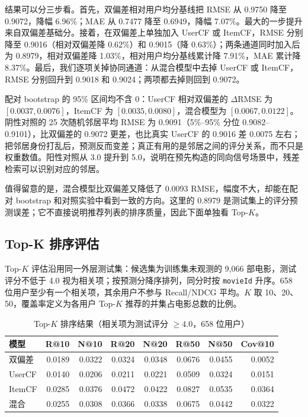 \documentclass[10pt,a4paper]{article}
\newcommand{\term}[1]{\textbf{\color{navy}#1}}
\newcommand{\code}[1]{\texttt{#1}}
\begin{document}
结果可以分三步看。首先，双偏差相对用户均分基线把 RMSE 从 0.9750 降至 0.9072，降幅 6.96\%；MAE 从 0.7477 降至 0.6949，降幅 7.07\%。最大的一步提升来自双偏差基础分。接着，在双偏差上单独加入 UserCF 或 ItemCF，RMSE 分别降至 0.9016（相对双偏差降 0.62\%）和 0.9015（降 0.63\%）；两条通道同时加入后为 0.8979，相对双偏差降 1.03\%，相对用户均分基线累计降 7.91\%，MAE 累计降 8.37\%。最后，我们逐项关掉协同通道：从混合模型中去掉 UserCF 或 ItemCF，RMSE 分别回升到 0.9018 和 0.9024；两项都去掉则回到 0.9072。

配对 bootstrap 的 95\% 区间均不含 0：UserCF 相对双偏差的 $\Delta$RMSE 为 $[0.0037,0.0076]$，ItemCF 为 $[0.0035,0.0080]$，混合模型为 $[0.0067,0.0122]$。阴性对照的 25 次随机邻居平均 RMSE 为 0.9091（5\%--95\% 分位 0.9082--0.9101），比双偏差的 0.9072 更差，也比真实 UserCF 的 0.9016 差 0.0075 左右；把邻居身份打乱后，预测反而变差；真正有用的是邻居之间的评分关系，而不只是权重数值。阳性对照从 3.0 提升到 5.0，说明在预先构造的同向信号场景中，残差检索可以识别对应的邻居。

值得留意的是，混合模型比双偏差又降低了 0.0093 RMSE，幅度不大，却能在配对 bootstrap 和对照实验中看到一致的方向。这里的 0.8979 是测试集上的评分预测误差；它不直接说明推荐列表的排序质量，因此下面单独看 Top-$K$。

\subsection{Top-K 排序评估}
Top-$K$ 评估沿用同一外层测试集：候选集为训练集未观测的 9,066 部电影，测试评分不低于 4.0 视为相关项；按预测分降序排列，同分时按 \code{movieId} 升序。658 位用户至少有一个相关项，其余用户不参与 Recall/NDCG 平均。$K$ 取 10、20、50，覆盖率定义为各用户 Top-$K$ 推荐的并集占电影总数的比例。

\begin{table}[htbp]
\centering
\small
\caption{Top-$K$ 排序结果（相关项为测试评分 $\ge 4.0$，658 位用户）}\label{tab:ranking}
\begin{tabular}{lrrrrrrr}
\toprule
\term{模型} & \term{R@10} & \term{N@10} & \term{R@20} & \term{N@20} & \term{R@50} & \term{N@50} & \term{Cov@10}\\
\midrule
双偏差 & 0.0189 & 0.0322 & 0.0324 & 0.0348 & 0.0676 & 0.0455 & 0.0052\\
UserCF & 0.0140 & 0.0206 & 0.0211 & 0.0221 & 0.0509 & 0.0324 & 0.0151\\
ItemCF & 0.0285 & 0.0376 & 0.0472 & 0.0422 & 0.0827 & 0.0535 & 0.0364\\
混合 & 0.0255 & 0.0308 & 0.0366 & 0.0338 & 0.0675 & 0.0442 & 0.0322\\
\bottomrule
\end{tabular}
\end{table}
\end{document}
